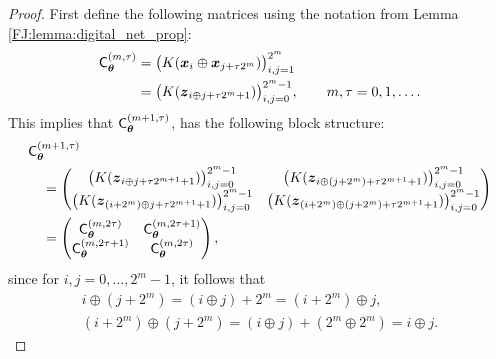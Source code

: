\documentclass[graybox,footinfo]{svmult}
\begin{document}
\begin{proof}
    First define the following matrices using the notation from Lemma \ref{FJ:lemma:digital_net_prop}:
    \begin{align*}
    \mathsf{C}_{{\boldsymbol{\theta}}}^{(m,\tau)} & = \bigl(K({\boldsymbol{x}}_i \oplus {\boldsymbol{x}}_{j + \tau 2^m} )\bigr)_{i,j=1}^{2^m} \\
    & = \bigl(K({\boldsymbol{z}}_{i\oplus j+ \tau 2^m + 1})\bigr)_{i,j=0}^{2^m-1}, \qquad m,\tau  = 0, 1, \ldots.
    \end{align*}
    This implies that  $\mathsf{C}_{{\boldsymbol{\theta}}}^{(m+1,\tau)}$, has the following block structure:
    \begin{align} \nonumber
    \MoveEqLeft[1]{\mathsf{C}_{\bstheta}^{(m+1,\tau)}} \\
    \nonumber
    & = 
    \begin{pmatrix} 
    \bigl(K(\bsz_{i\oplus j+ \tau 2^{m+1} + 1})\bigr)_{i,j=0}^{2^m-1} &
    \bigl(K(\bsz_{i\oplus (j+2^m)+ \tau 2^{m+1} +1})\bigr)_{i,j=0}^{2^m-1} \\
    \bigl(K(\bsz_{(i + 2^m) \oplus j + \tau 2^{m+1}+1})\bigr)_{i,j=0}^{2^m-1} &
    \bigl(K(\bsz_{(i + 2^m) \oplus (j+2^m) + \tau 2^{m+1} +1})\bigr)_{i,j=0}^{2^m-1}
    \end{pmatrix} \\
    & = \begin{pmatrix} \mathsf{C}_{\bstheta}^{(m, 2\tau)} & \mathsf{C}_{\bstheta}^{(m,2 \tau+1)} \\
    \mathsf{C}_{\bstheta}^{(m,2 \tau+1)} & \mathsf{C}_{\bstheta}^{(m,2 \tau)}
    \end{pmatrix} , \label{FJ:eq:cblock}
    \end{align}
    since for $i,j = 0, \ldots, 2^m-1$, it follows that 
    \begin{gather*}
        i\oplus (j+2^m)  = (i\oplus j) + 2^m  = (i + 2^m) \oplus j  ,\\
        (i + 2^m) \oplus (j+2^m)  = (i\oplus j) + (2^m \oplus 2^m)= i\oplus j.
    \end{gather*}
    

\end{proof}
\end{document}
